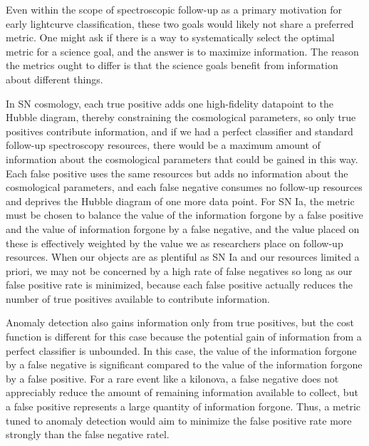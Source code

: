 Even within the scope of spectroscopic follow-up as a primary motivation for early lightcurve classification, these two goals would likely not share a preferred metric.
One might ask if there is a way to systematically select the optimal metric for a science goal, and the answer is to maximize information.
The reason the metrics ought to differ is that the science goals benefit from information about different things.

In SN cosmology, each true positive adds one high-fidelity datapoint to the Hubble diagram, thereby constraining the cosmological parameters, so only true positives contribute information, and if we had a perfect classifier and standard follow-up spectroscopy resources, there would be a maximum amount of information about the cosmological parameters that could be gained in this way.
Each false positive uses the same resources but adds no information about the cosmological parameters, and each false negative consumes no follow-up resources and deprives the Hubble diagram of one more data point.
For SN Ia, the metric must be chosen to balance the value of the information forgone by a false positive and the value of information forgone by a false negative, and the value placed on these is effectively weighted by the value we as researchers place on follow-up resources.
When our objects are as plentiful as SN Ia and our resources limited a priori, we may not be concerned by a high rate of false negatives so long as our false positive rate is minimized, because each false positive actually reduces the number of true positives available to contribute information.

Anomaly detection also gains information only from true positives, but the cost function is different for this case because the potential gain of information from a perfect classifier is unbounded.
In this case, the value of the information forgone by a false negative is significant compared to the value of the information forgone by a false positive.
For a rare event like a kilonova, a false negative does not appreciably reduce the amount of remaining information available to collect, but a false positive represents a large quantity of information forgone.
Thus, a metric tuned to anomaly detection would aim to minimize the false positive rate more strongly than the false negative ratel.

%


